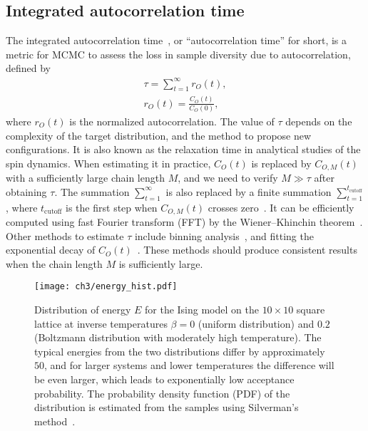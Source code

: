 \subsection{Integrated autocorrelation time}

The integrated autocorrelation time~\cite{ambegaokar2010estimating, goodman2010ensemble}, or ``autocorrelation time'' for short, is a metric for MCMC to assess the loss in sample diversity due to autocorrelation, defined by
\begin{align}
\tau = \sum_{t = 1}^\infty r_O(t), \label{eq:iat} \\
r_O(t) = \frac{C_O(t)}{C_O(0)}, \label{eq:rt}
\end{align}
where $r_O(t)$ is the normalized autocorrelation. The value of $\tau$ depends on the complexity of the target distribution, and the method to propose new configurations. It is also known as the relaxation time in analytical studies of the spin dynamics. When estimating it in practice, $C_O(t)$ is replaced by $C_{O, M}(t)$ with a sufficiently large chain length $M$, and we need to verify $M \gg \tau$ after obtaining $\tau$. The summation $\sum_{t = 1}^\infty$ is also replaced by a finite summation $\sum_{t = 1}^{t_\text{cutoff}}$, where $t_\text{cutoff}$ is the first step when $C_{O, M}(t)$ crosses zero~\cite{wu2021unbiased}. It can be efficiently computed using fast Fourier transform (FFT) by the Wiener--Khinchin theorem~\cite{wiener1930generalized}. Other methods to estimate $\tau$ include binning analysis~\cite{wallerberger2018efficient}, and fitting the exponential decay of $C_O(t)$~\cite{bialas2023analysis}. These methods should produce consistent results when the chain length $M$ is sufficiently large.

\begin{figure}[htb]
\centering
\texttt{[image: ch3/energy\_hist.pdf]}
\caption[Distribution of energy for Ising model at different temperatures]{
Distribution of energy $E$ for the Ising model on the $10 \times 10$ square lattice at inverse temperatures $\beta = 0$ (uniform distribution) and $0.2$ (Boltzmann distribution with moderately high temperature).
The typical energies from the two distributions differ by approximately $50$, and for larger systems and lower temperatures the difference will be even larger, which leads to exponentially low acceptance probability.
The probability density function (PDF) of the distribution is estimated from the samples using Silverman’s method~\cite{silverman1986density}.
}
\label{fig:energy-hist}
\end{figure}

